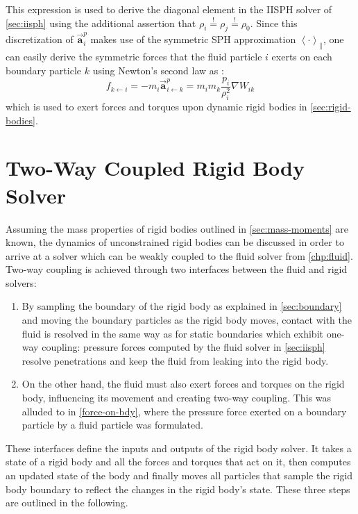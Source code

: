 \documentclass[oneside, a4paper]{book}
\newcommand\angled[1]{\left\langle#1\right\rangle}
\newcommand\vek[1]{\vec{\bm{#1}}}
\begin{document}
    This expression is used to derive the diagonal element in the IISPH solver of \autoref{sec:iisph} using the additional assertion that $\rho_i\overset{!}{=}\rho_j\overset{!}{=}\rho_0$. Since this discretization of $\vek{a}_i^p$ makes use of the symmetric SPH approximation $\angled{\cdot}_\parallel$, one can easily derive the symmetric forces that the fluid particle $i$ exerts on each boundary particle $k$ using Newton's second law as \autocite{versatile-boundary-akinci}:
    \begin{equation}\label{force-on-bdy}
      f_{k\leftarrow i} = - m_i \vek{a}_{i\leftarrow k}^p = m_i m_k\frac{p_i}{\rho_i^2} \nabla W_{ik}
    \end{equation}
    which is used to exert forces and torques upon dynamic rigid bodies in \autoref{sec:rigid-bodies}.


    \section{Two-Way Coupled Rigid Body Solver}\label{sec:rigid-bodies}
    Assuming the mass properties of rigid bodies outlined in \autoref{sec:mass-moments} are known, the dynamics of unconstrained rigid bodies can be discussed in order to arrive at a solver which can be weakly coupled to the fluid solver from \autoref{chp:fluid}. Two-way coupling is achieved through two interfaces between the fluid and rigid solvers:
    \begin{enumerate}
      \item By sampling the boundary of the rigid body as explained in \autoref{sec:boundary} and moving the boundary particles as the rigid body moves, contact with the fluid is resolved in the same way as for static boundaries which exhibit one-way coupling: pressure forces computed by the fluid solver in \autoref{sec:iisph} resolve penetrations and keep the fluid from leaking into the rigid body.
      \item On the other hand, the fluid must also exert forces and torques on the rigid body, influencing its movement and creating two-way coupling. This was alluded to in \autoref{force-on-bdy}, where the pressure force exerted on a boundary particle by a fluid particle was formulated.
    \end{enumerate}

    These interfaces define the inputs and outputs of the rigid body solver. It takes a state of a rigid body and all the forces and torques that act on it, then computes an updated state of the body and finally moves all particles that sample the rigid body boundary to reflect the changes in the rigid body's state.
    These three steps are outlined in the following.
\end{document}
